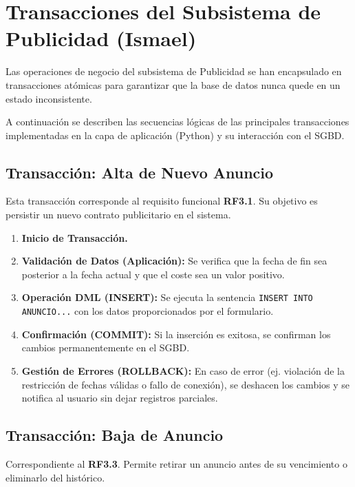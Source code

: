 \section{Transacciones del Subsistema de Publicidad (Ismael)}

Las operaciones de negocio del subsistema de Publicidad se han encapsulado en transacciones atómicas para garantizar que la base de datos nunca quede en un estado inconsistente. 

A continuación se describen las secuencias lógicas de las principales transacciones implementadas en la capa de aplicación (Python) y su interacción con el SGBD.

\subsection{Transacción: Alta de Nuevo Anuncio}
Esta transacción corresponde al requisito funcional \textbf{RF3.1}. Su objetivo es persistir un nuevo contrato publicitario en el sistema.

\begin{enumerate}
    \item \textbf{Inicio de Transacción.}
    \item \textbf{Validación de Datos (Aplicación):} Se verifica que la fecha de fin sea posterior a la fecha actual y que el coste sea un valor positivo.
    \item \textbf{Operación DML (INSERT):} Se ejecuta la sentencia \texttt{INSERT INTO ANUNCIO...} con los datos proporcionados por el formulario.
    \item \textbf{Confirmación (COMMIT):} Si la inserción es exitosa, se confirman los cambios permanentemente en el SGBD.
    \item \textbf{Gestión de Errores (ROLLBACK):} En caso de error (ej. violación de la restricción de fechas válidas o fallo de conexión), se deshacen los cambios y se notifica al usuario sin dejar registros parciales.
\end{enumerate}

\subsection{Transacción: Baja de Anuncio}
Correspondiente al \textbf{RF3.3}. Permite retirar un anuncio antes de su vencimiento o eliminarlo del histórico.

